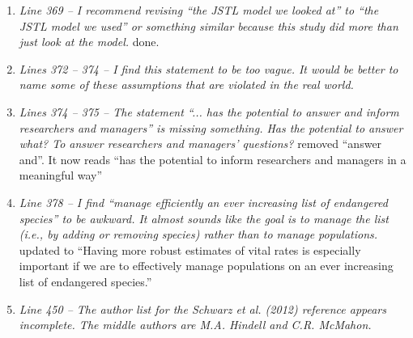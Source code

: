 \documentclass[12pt]{article}
\begin{document}
\begin{enumerate}
\begin{enumerate}
\item {\it Line 369 – I recommend revising “the JSTL model we looked at” to “the JSTL model we used” or something similar because this study did more than just look at the model.} done.

\item {\it Lines 372 – 374 – I find this statement to be too vague. It would be better to name some of these assumptions that are violated in the real world.}

\item {\it Lines 374 – 375 – The statement “... has the potential to answer and inform researchers and managers” is missing something. Has the potential to answer what? To answer researchers and managers’ questions?}
removed ``answer and''. It now reads ``has the potential to inform researchers and managers in a meaningful way''

\item {\it Line 378 – I find “manage efficiently an ever increasing list of endangered species” to be awkward. It almost sounds like the goal is to manage the list (i.e., by adding or removing species) rather than to manage populations.}
updated to ``Having more robust estimates of vital rates is especially important if we are to effectively manage populations on an ever increasing list of endangered species.''

\item {\it Line 450 – The author list for the Schwarz et al. (2012) reference appears incomplete. The middle authors are M.A. Hindell and C.R. McMahon.}
\end{enumerate}



\end{enumerate}



\bigskip
\end{document}
